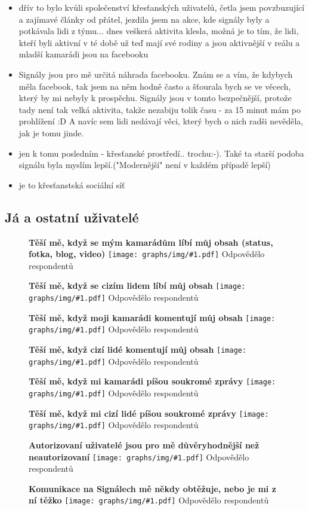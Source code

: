\documentclass[12pt, a4paper, twoside]{article}
\newcommand{\answercount}[1]{Odpovědělo  respondentů}
\newcommand{\includegraph}[2]{
  \begin{figure}[H]
    \centering
    \textbf{#2}
    \texttt{[image: graphs/img/\#1.pdf]}
    \answercount{#1}
  \end{figure}
}
\begin{document}
\begin{itemize}
\item dřív to bylo kvůli společenství křesťanských uživatelů, četla jsem povzbuzující a zajímavé články od přátel, jezdila jsem na akce, kde signály byly a potkávala lidi z týmu... dnes veškerá aktivita klesla, možná je to tím, že lidi, kteří byli aktivní v té době už teď mají své rodiny a jsou aktivnější v reálu a mladší kamarádi jsou na facebooku

\item Signály jsou pro mě určitá náhrada facebooku. Znám se a vím, že kdybych měla facebook, tak jsem na něm hodně často a šťourala bych se ve věcech, který by mi nebyly k prospěchu. Signály jsou v tomto bezpečnější, protože tady není tak velká aktivita, takže nezabiju tolik času - za 15 minut mám po prohlížení :D A navíc sem lidi nedávají věci, který bych o nich radši nevěděla, jak je tomu jinde.

\item jen k tomu posledním - křesťanské prostředí..  trochu:-). Také ta starší podoba signálu byla myslím lepší.("Modernější" není v každém případě lepší)

\item je to křesťanstská sociální síť
\end{itemize}

\subsection{Já a ostatní uživatelé}\label{sec:ostatniuzivatele}

\includegraph{ostatni_tesi_me_libi_se_kamaradi}{Těší mě, když se mým kamarádům líbí můj obsah (status, fotka, blog, video)}

\includegraph{ostatni_tesi_me_libi_se_cizi}{Těší mě, když se cizím lidem líbí můj obsah}

\includegraph{ostatni_tesi_me_komentar_kamaradi}{Těší mě, když moji kamarádi komentují můj obsah}

\includegraph{ostatni_tesi_me_komentar_cizi}{Těší mě, když cizí lidé komentují můj obsah}

\includegraph{ostatni_tesi_me_zprava_kamaradi}{Těší mě, když mi kamarádi píšou soukromé zprávy}

\includegraph{ostatni_tesi_me_zprava_cizi}{Těší mě, když mi cizí lidé píšou soukromé zprávy}

\includegraph{ostatni_autorizovani_duveryhodnejsi}{Autorizovaní uživatelé jsou pro mě důvěryhodnější než neautorizovaní}

\includegraph{ostatni_neprijemne_komunikace_obtezuje}{Komunikace na Signálech mě někdy obtěžuje, nebo je mi z ní těžko}
\end{document}
